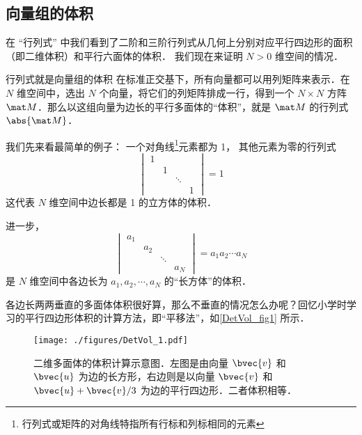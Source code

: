 

\subsection{向量组的体积}

在 “行列式” 中我们看到了二阶和三阶行列式从几何上分别对应平行四边形的面积（即二维体积）和平行六面体的体积． 我们现在来证明 $N > 0$ 维空间的情况．

\begin{theorem}{行列式就是向量组的体积}
在标准正交基下，所有向量都可以用列矩阵来表示．在 $N$ 维空间中，选出 $N$ 个向量，将它们的列矩阵排成一行，得到一个 $N\times N$ 方阵 $\mat M$．那么以这组向量为边长的平行多面体的“体积”，就是 $\mat M$ 的行列式 $\abs{\mat M}$．
\end{theorem}


我们先来看最简单的例子： 一个对角线\footnote{行列式或矩阵的对角线特指所有行标和列标相同的元素}元素都为 1， 其他元素为零的行列式
\begin{equation}
\begin{vmatrix}
1 & & &\\
  & 1 & &\\
  &  & \ddots &\\
  & & & 1
\end{vmatrix} = 1
\end{equation}
这代表 $N$ 维空间中边长都是 1 的立方体的体积．

进一步，
\begin{equation}
\begin{vmatrix}
a_1 & & &\\
  & a_2 & &\\
  &  & \ddots &\\
  & & & a_N
\end{vmatrix} = a_1a_2\cdots a_N
\end{equation}
是 $N$ 维空间中各边长为 $a_1, a_2, \cdots, a_N$ 的“长方体”的体积．

各边长两两垂直的多面体体积很好算，那么不垂直的情况怎么办呢？回忆小学时学习的平行四边形体积的计算方法，即“平移法”，如\autoref{DetVol_fig1} 所示．
\begin{figure}[ht]
\centering
\texttt{[image: ./figures/DetVol\_1.pdf]}
\caption{二维多面体的体积计算示意图．左图是由向量 $\bvec{v}$ 和 $\bvec{u}$ 为边的长方形，右边则是以向量 $\bvec{v}$ 和 $\bvec{u}+\bvec{v}/3$ 为边的平行四边形．二者体积相等．} \label{DetVol_fig1}
\end{figure}

